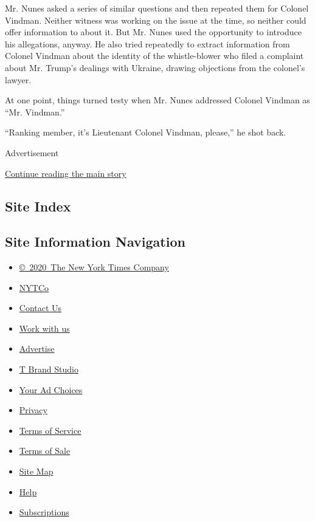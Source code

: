 Mr. Nunes asked a series of similar questions and then repeated them for
Colonel Vindman. Neither witness was working on the issue at the time,
so neither could offer information to about it. But Mr. Nunes used the
opportunity to introduce his allegations, anyway. He also tried
repeatedly to extract information from Colonel Vindman about the
identity of the whistle-blower who filed a complaint about Mr. Trump's
dealings with Ukraine, drawing objections from the colonel's lawyer.

At one point, things turned testy when Mr. Nunes addressed Colonel
Vindman as ``Mr. Vindman.''

``Ranking member, it's Lieutenant Colonel Vindman, please,'' he shot
back.

Advertisement

\protect\hyperlink{after-bottom}{Continue reading the main story}

\hypertarget{site-index}{%
\subsection{Site Index}\label{site-index}}

\hypertarget{site-information-navigation}{%
\subsection{Site Information
Navigation}\label{site-information-navigation}}

\begin{itemize}
\tightlist
\item
  \href{https://help.nytimes.com/hc/en-us/articles/115014792127-Copyright-notice}{©~2020~The
  New York Times Company}
\end{itemize}

\begin{itemize}
\tightlist
\item
  \href{https://www.nytco.com/}{NYTCo}
\item
  \href{https://help.nytimes.com/hc/en-us/articles/115015385887-Contact-Us}{Contact
  Us}
\item
  \href{https://www.nytco.com/careers/}{Work with us}
\item
  \href{https://nytmediakit.com/}{Advertise}
\item
  \href{http://www.tbrandstudio.com/}{T Brand Studio}
\item
  \href{https://www.nytimes.com/privacy/cookie-policy\#how-do-i-manage-trackers}{Your
  Ad Choices}
\item
  \href{https://www.nytimes.com/privacy}{Privacy}
\item
  \href{https://help.nytimes.com/hc/en-us/articles/115014893428-Terms-of-service}{Terms
  of Service}
\item
  \href{https://help.nytimes.com/hc/en-us/articles/115014893968-Terms-of-sale}{Terms
  of Sale}
\item
  \href{https://spiderbites.nytimes.com}{Site Map}
\item
  \href{https://help.nytimes.com/hc/en-us}{Help}
\item
  \href{https://www.nytimes.com/subscription?campaignId=37WXW}{Subscriptions}
\end{itemize}
